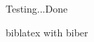 \documentclass[12pt,oneside]{book}
\theoremstyle{definition}
\numberwithin{equation}{chapter}
\numberwithin{figure}{chapter}
\numberwithin{table}{chapter}
\begin{document}
Testing...Done

biblatex with biber
\end{document}

